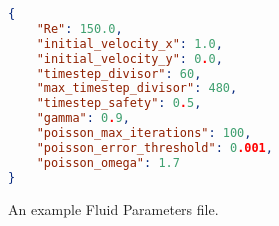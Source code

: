 \begin{figure}[ht]
    \centering
    \begin{lstlisting}[language=JSON]
{
    "Re": 150.0,
    "initial_velocity_x": 1.0,
    "initial_velocity_y": 0.0,
    "timestep_divisor": 60,
    "max_timestep_divisor": 480,
    "timestep_safety": 0.5,
    "gamma": 0.9,
    "poisson_max_iterations": 100,
    "poisson_error_threshold": 0.001,
    "poisson_omega": 1.7
}
\end{lstlisting}
    \caption{An example Fluid Parameters file.}
    \label{fig:FluidParamsExample}
\end{figure}